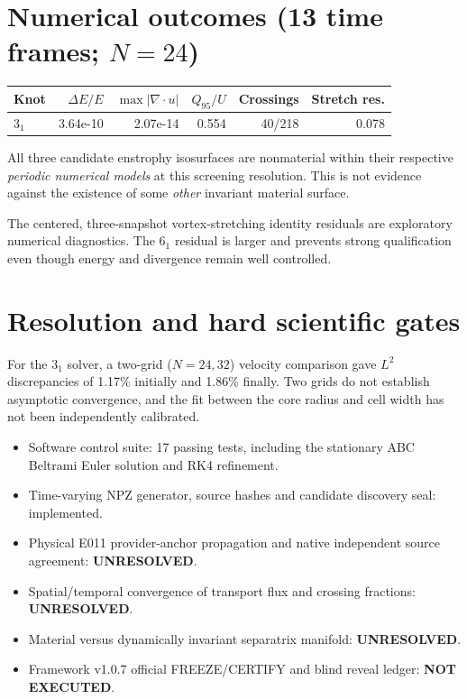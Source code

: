 \documentclass[10pt,a4paper]{article}
\begin{document}
\section{Numerical outcomes (13 time frames; $N=24$)}
\begin{center}\small
\begin{tabular}{lrrrrr}\toprule
Knot & $\Delta E/E$ & $\max|\nabla\cdot u|$ & $Q_{95}/U$ & Crossings & Stretch res.\\\midrule
$3_1$ & 3.64e-10 & 2.07e-14 & 0.554 & 40/218 & 0.078 \\
\bottomrule\end{tabular}\end{center}

All three candidate enstrophy isosurfaces are nonmaterial within their respective \emph{periodic numerical models} at this screening resolution. This is not evidence against the existence of some \emph{other} invariant material surface.
\par The centered, three-snapshot vortex-stretching identity residuals are exploratory numerical diagnostics. The $6_1$ residual is larger and prevents strong qualification even though energy and divergence remain well controlled.
\section{Resolution and hard scientific gates}
For the $3_1$ solver, a two-grid ($N=24,32$) velocity comparison gave $L^2$ discrepancies of 1.17\% initially and 1.86\% finally. Two grids do not establish asymptotic convergence, and the fit between the core radius and cell width has not been independently calibrated.
\begin{itemize}
\item Software control suite: 17 passing tests, including the stationary ABC Beltrami Euler solution and RK4 refinement.
\item Time-varying NPZ generator, source hashes and candidate discovery seal: implemented.
\item Physical E011 provider-anchor propagation and native independent source agreement: \textbf{UNRESOLVED}.
\item Spatial/temporal convergence of transport flux and crossing fractions: \textbf{UNRESOLVED}.
\item Material versus dynamically invariant separatrix manifold: \textbf{UNRESOLVED}.
\item Framework v1.0.7 official FREEZE/CERTIFY and blind reveal ledger: \textbf{NOT EXECUTED}.
\end{itemize}
\end{document}
